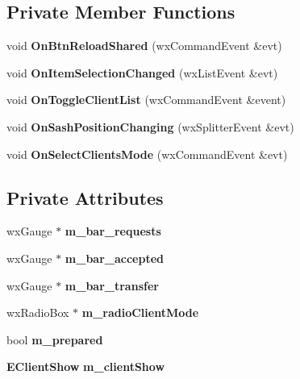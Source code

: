 \subsection*{Private Member Functions}
\begin{DoxyCompactItemize}
\item 
void {\bf OnBtnReloadShared} (wxCommandEvent \&evt)\label{classCSharedFilesWnd_af00b17454d4a67da5dbac3319d2ab51d}

\item 
void {\bf OnItemSelectionChanged} (wxListEvent \&evt)\label{classCSharedFilesWnd_a1bc582323665747d5a96eaf0a328eff3}

\item 
void {\bf OnToggleClientList} (wxCommandEvent \&event)\label{classCSharedFilesWnd_a907ccf061c0786ce475bfb97c10d329f}

\item 
void {\bf OnSashPositionChanging} (wxSplitterEvent \&evt)\label{classCSharedFilesWnd_adad2132c15c5d613e141807496e098aa}

\item 
void {\bf OnSelectClientsMode} (wxCommandEvent \&evt)\label{classCSharedFilesWnd_ac080eeb7b0c3b0b1c2786022b430bcd9}

\end{DoxyCompactItemize}
\subsection*{Private Attributes}
\begin{DoxyCompactItemize}
\item 
wxGauge $\ast$ {\bf m\_\-bar\_\-requests}\label{classCSharedFilesWnd_ac61ad0779bf80721afb95f96fdc8fb6e}

\item 
wxGauge $\ast$ {\bf m\_\-bar\_\-accepted}\label{classCSharedFilesWnd_a4551729cff245d8b3aec21aac3189880}

\item 
wxGauge $\ast$ {\bf m\_\-bar\_\-transfer}\label{classCSharedFilesWnd_a5ed483f064424cc5f2521dc335dc47ba}

\item 
wxRadioBox $\ast$ {\bf m\_\-radioClientMode}\label{classCSharedFilesWnd_ace15a44ef2c51a2af020f2cd72c0ba49}

\item 
bool {\bf m\_\-prepared}\label{classCSharedFilesWnd_a0402b7a47886caf73e53d9724e0cb91b}

\item 
{\bf EClientShow} {\bfseries m\_\-clientShow}\label{classCSharedFilesWnd_a7ff05d2d8492bd45651b22d22b44305a}

\end{DoxyCompactItemize}
